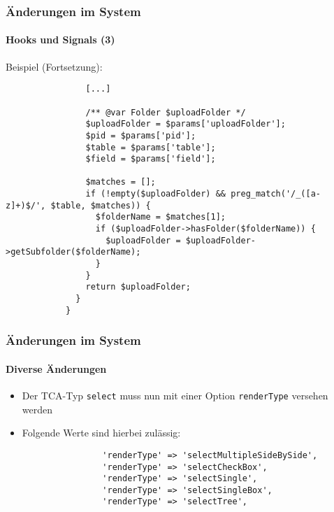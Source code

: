 \begin{frame}[fragile]
	\frametitle{Änderungen im System}
	\framesubtitle{Hooks und Signals (3)}

	\lstset{basicstyle=\tiny\ttfamily}

	\small Beispiel (Fortsetzung):\normalsize

		\begin{lstlisting}
			    [...]

			    /** @var Folder $uploadFolder */
			    $uploadFolder = $params['uploadFolder'];
			    $pid = $params['pid'];
			    $table = $params['table'];
			    $field = $params['field'];

			    $matches = [];
			    if (!empty($uploadFolder) && preg_match('/_([a-z]+)$/', $table, $matches)) {
			      $folderName = $matches[1];
			      if ($uploadFolder->hasFolder($folderName)) {
			        $uploadFolder = $uploadFolder->getSubfolder($folderName);
			      }
			    }
			    return $uploadFolder;
			  }
			}
		\end{lstlisting}

\end{frame}

\begin{frame}[fragile]
	\frametitle{Änderungen im System}
	\framesubtitle{Diverse Änderungen}

	\begin{itemize}

		\item Der TCA-Typ \texttt{select} muss nun mit einer Option \texttt{renderType}
			versehen werden

		\item Folgende Werte sind hierbei zulässig:

			\begin{lstlisting}
				'renderType' => 'selectMultipleSideBySide',
				'renderType' => 'selectCheckBox',
				'renderType' => 'selectSingle',
				'renderType' => 'selectSingleBox',
				'renderType' => 'selectTree',
			\end{lstlisting}

	\end{itemize}

\end{frame}

